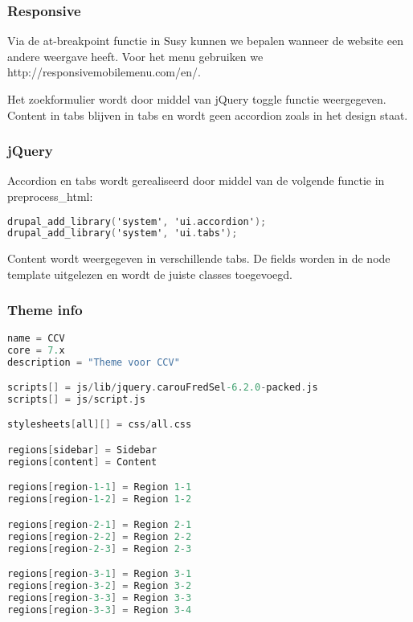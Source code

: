 \subsubsection{Responsive}
Via de at-breakpoint functie in Susy kunnen we bepalen wanneer de website een andere weergave heeft.
Voor het menu gebruiken we http://responsivemobilemenu.com/en/.

Het zoekformulier wordt door middel van jQuery toggle functie weergegeven.
Content in tabs blijven in tabs en wordt geen accordion zoals in het design staat.

\subsubsection{jQuery}
Accordion en tabs wordt gerealiseerd door middel van de volgende functie in preprocess\_html:
\begin{lstlisting}[language=C]
drupal_add_library('system', 'ui.accordion');
drupal_add_library('system', 'ui.tabs');
\end{lstlisting}

Content wordt weergegeven in verschillende tabs. De fields worden in de node template uitgelezen en wordt de juiste classes toegevoegd.

\subsubsection{Theme info}
\begin{lstlisting}[language=C] 
name = CCV
core = 7.x
description = "Theme voor CCV"

scripts[] = js/lib/jquery.carouFredSel-6.2.0-packed.js
scripts[] = js/script.js

stylesheets[all][] = css/all.css

regions[sidebar] = Sidebar
regions[content] = Content

regions[region-1-1] = Region 1-1
regions[region-1-2] = Region 1-2

regions[region-2-1] = Region 2-1
regions[region-2-2] = Region 2-2
regions[region-2-3] = Region 2-3

regions[region-3-1] = Region 3-1
regions[region-3-2] = Region 3-2
regions[region-3-3] = Region 3-3
regions[region-3-3] = Region 3-4
\end{lstlisting} 
 